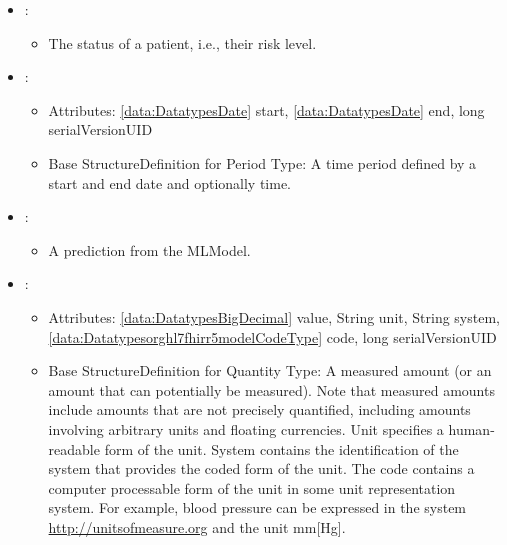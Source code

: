 \begin{itemize}[nolistsep,noitemsep]
\item {}: 
\begin{itemize}[noitemsep,nolistsep]

\item[] The status of a patient, i.e., their risk level.
\end{itemize}

\item {}: 
\begin{itemize}[noitemsep,nolistsep]
\item[] Attributes: \ref{data:DatatypesDate} start, \ref{data:DatatypesDate} end, long serialVersionUID
\item[] Base StructureDefinition for Period Type: A time period defined by a start and end date and optionally time.
\end{itemize}

\item {}: 
\begin{itemize}[noitemsep,nolistsep]

\item[] A prediction from the MLModel.
\end{itemize}

\item {}: 
\begin{itemize}[noitemsep,nolistsep]
\item[] Attributes: \ref{data:DatatypesBigDecimal} value, String unit, String system, \ref{data:Datatypesorghl7fhirr5modelCodeType} code, long serialVersionUID
\item[] Base StructureDefinition for Quantity Type: A measured amount (or an amount that can potentially be measured). Note that measured amounts include amounts that are not precisely quantified, including amounts involving arbitrary units and floating currencies.
Unit specifies a human-readable form of the unit.
System contains the identification of the system that provides the coded form of the unit.
The code contains a computer processable form of the unit in some unit representation system.
For example, blood pressure can be expressed in the system \url{http://unitsofmeasure.org} and the unit mm[Hg].
\end{itemize}


\end{itemize}
